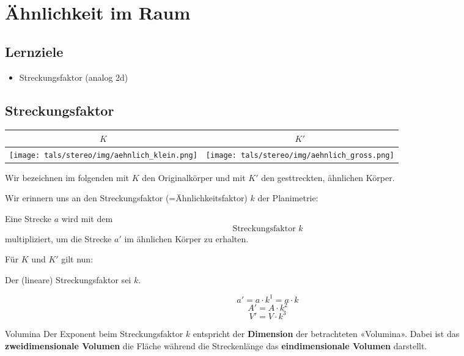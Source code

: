 \section{Ähnlichkeit im Raum}


\subsection*{Lernziele}
\begin{itemize}
\item Streckungsfaktor (analog 2d)
\end{itemize}
\newpage

\subsection{Streckungsfaktor}

\begin{tabular}{cc}
  $K$ & $K'$ \\
  \hline
  \texttt{[image: tals/stereo/img/aehnlich\_klein.png]} & \texttt{[image: tals/stereo/img/aehnlich\_gross.png]}\\%
\end{tabular} 

Wir bezeichnen im folgenden mit $K$ den Originalkörper und mit $K'$ den gesttreckten, ähnlichen Körper.

Wir erinnern uns an den Streckungsfaktor (=Ähnlichkeitsfaktor) $k$ der Planimetrie:
\begin{definition}{}{}
  Eine Strecke $a$ wird mit dem
  $$\text{Streckungsfaktor} \,\, k$$
  multipliziert, um die Strecke $a'$ im ähnlichen Körper zu erhalten.
\end{definition}

Für $K$ und $K'$ gilt nun:

\begin{gesetz}{}{}
  Der (lineare) Streckungsfaktor sei $k$.

  $$a' = a \cdot{} k^1 = a\cdot{}k $$
  $$A' = A \cdot{} k^2 $$
  $$V' = V \cdot{} k^3 $$
\end{gesetz}

\begin{bemerkung}{Volumina}{}
Der Exponent beim Streckungsfaktor $k$ entspricht der \textbf{Dimension} der
betrachteten «Volumina». Dabei ist das \textbf{zweidimensionale Volumen} die
Fläche während die Streckenlänge das \textbf{eindimensionale Volumen} darstellt.
\end{bemerkung}

